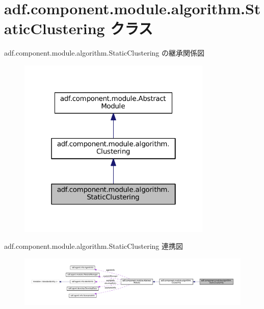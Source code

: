 \hypertarget{classadf_1_1component_1_1module_1_1algorithm_1_1StaticClustering}{}\section{adf.\+component.\+module.\+algorithm.\+Static\+Clustering クラス}
\label{classadf_1_1component_1_1module_1_1algorithm_1_1StaticClustering}


adf.\+component.\+module.\+algorithm.\+Static\+Clustering の継承関係図
\nopagebreak
\begin{figure}[H]
\begin{center}
\leavevmode
\includegraphics[width=262pt]{classadf_1_1component_1_1module_1_1algorithm_1_1StaticClustering__inherit__graph}
\end{center}
\end{figure}


adf.\+component.\+module.\+algorithm.\+Static\+Clustering 連携図
\nopagebreak
\begin{figure}[H]
\begin{center}
\leavevmode
\includegraphics[width=350pt]{classadf_1_1component_1_1module_1_1algorithm_1_1StaticClustering__coll__graph}
\end{center}
\end{figure}
